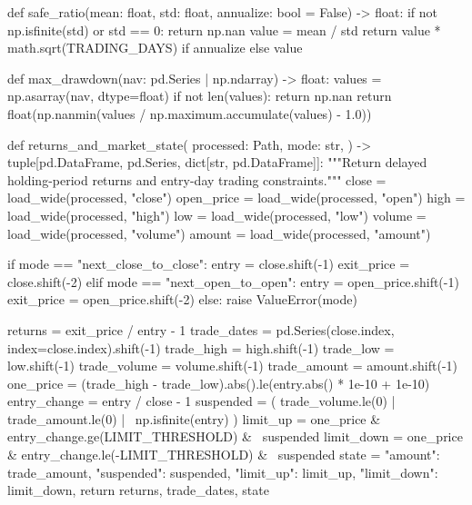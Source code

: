 \documentclass[UTF8,a4paper,fontset=fandol]{ctexart}
\begin{document}
\begin{ProjectCode}
def safe_ratio(mean: float, std: float, annualize: bool = False) -> float:
    if not np.isfinite(std) or std == 0:
        return np.nan
    value = mean / std
    return value * math.sqrt(TRADING_DAYS) if annualize else value


def max_drawdown(nav: pd.Series | np.ndarray) -> float:
    values = np.asarray(nav, dtype=float)
    if not len(values):
        return np.nan
    return float(np.nanmin(values / np.maximum.accumulate(values) - 1.0))


def returns_and_market_state(
    processed: Path,
    mode: str,
) -> tuple[pd.DataFrame, pd.Series, dict[str, pd.DataFrame]]:
    """Return delayed holding-period returns and entry-day trading constraints."""
    close = load_wide(processed, "close")
    open_price = load_wide(processed, "open")
    high = load_wide(processed, "high")
    low = load_wide(processed, "low")
    volume = load_wide(processed, "volume")
    amount = load_wide(processed, "amount")

    if mode == "next_close_to_close":
        entry = close.shift(-1)
        exit_price = close.shift(-2)
    elif mode == "next_open_to_open":
        entry = open_price.shift(-1)
        exit_price = open_price.shift(-2)
    else:
        raise ValueError(mode)

    returns = exit_price / entry - 1
    trade_dates = pd.Series(close.index, index=close.index).shift(-1)
    trade_high = high.shift(-1)
    trade_low = low.shift(-1)
    trade_volume = volume.shift(-1)
    trade_amount = amount.shift(-1)
    one_price = (trade_high - trade_low).abs().le(entry.abs() * 1e-10 + 1e-10)
    entry_change = entry / close - 1
    suspended = (
        trade_volume.le(0)
        | trade_amount.le(0)
        | ~np.isfinite(entry)
    )
    limit_up = one_price & entry_change.ge(LIMIT_THRESHOLD) & ~suspended
    limit_down = one_price & entry_change.le(-LIMIT_THRESHOLD) & ~suspended
    state = {
        "amount": trade_amount,
        "suspended": suspended,
        "limit_up": limit_up,
        "limit_down": limit_down,
    }
    return returns, trade_dates, state



\end{ProjectCode}
\end{document}
